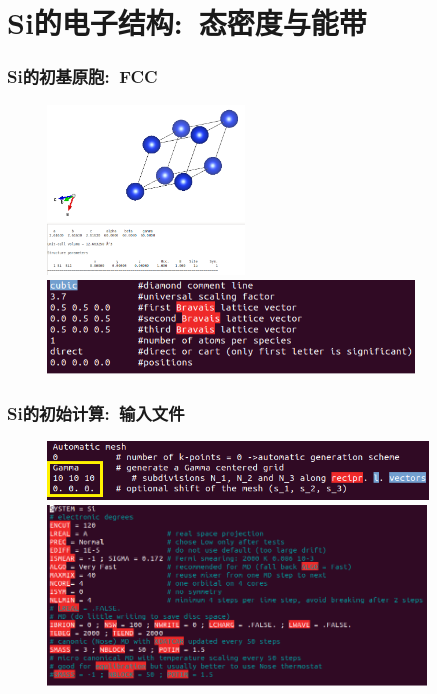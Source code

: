 \section{{\rm Si}的电子结构:~态密度与能带}\label{Sec:Si-band}
\frame
{
	\frametitle{\textrm{Si}的初基原胞:~\textrm{FCC}}
\vspace*{-13pt}
\begin{figure}[h!]
\centering
\includegraphics[height=1.78in]{Figures/VASP_example-Si_POSCAR-1-Fig.png}
\vskip 1pt
\includegraphics[height=0.98in]{Figures/VASP_example-Si_POSCAR-1.png}
\label{Fig:VASP-Si_POSCAR}
\end{figure}
}

\frame
{
	\frametitle{\textrm{Si}的初始计算:~输入文件}
\vspace*{-5pt}
\begin{figure}[h!]
\centering
\includegraphics[height=0.62in]{Figures/VASP_example-Si_KPOINTS-G.png}
\vskip 4pt
\includegraphics[height=1.88in]{Figures/VASP_example-Si_INCAR-dyn.png}
\label{Fig:VASP-Si_KPOINT-INCAR}
\end{figure}
}

